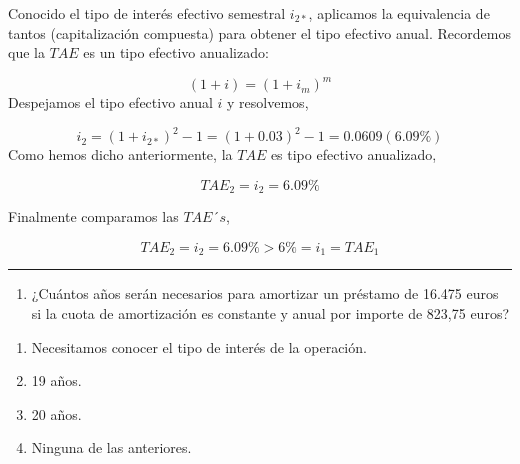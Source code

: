 \documentclass[
  letterpaper,
  DIV=11,
  numbers=noendperiod]{scrreprt}
\providecommand{\tightlist}{%
  \setlength{\itemsep}{0pt}\setlength{\parskip}{0pt}}\usepackage{longtable,booktabs,array}
\begin{document}
\begin{tcolorbox}[enhanced jigsaw, left=2mm, opacityback=0, colback=white, breakable, arc=.35mm, bottomrule=.15mm, rightrule=.15mm, toprule=.15mm, leftrule=.75mm, colframe=quarto-callout-tip-color-frame]
\begin{minipage}[t]{\textwidth - 5.5mm}
Conocido el tipo de interés efectivo semestral \(i_{2*}\), aplicamos la
equivalencia de tantos (capitalización compuesta) para obtener el tipo
efectivo anual. Recordemos que la \(TAE\) es un tipo efectivo
anualizado:

\[(1+i)=(1+ i _m)^m\] Despejamos el tipo efectivo anual \(i\) y
resolvemos,

\[i_2=\left(1+{i_{2*}}\right)^2-1=\left(1+0.03\right)^2-1=0.0609\left(6.09\%\right)\]
Como hemos dicho anteriormente, la \(TAE\) es tipo efectivo anualizado,

\[TAE_2=i_2=6.09\%\]

Finalmente comparamos las \(TAE´s\),

\[TAE_2=i_2=6.09\%>6\%=i_1=TAE_1\]

\end{minipage}%
\end{tcolorbox}

\begin{center}\rule{0.5\linewidth}{0.5pt}\end{center}

\begin{enumerate}
\def\labelenumi{\arabic{enumi}.}
\setcounter{enumi}{12}
\tightlist
\item
  ¿Cuántos años serán necesarios para amortizar un préstamo de 16.475
  euros si la cuota de amortización es constante y anual por importe de
  823,75 euros?
\end{enumerate}

\begin{enumerate}
\def\labelenumi{\alph{enumi})}
\item
  Necesitamos conocer el tipo de interés de la operación.
\item
  19 años.
\item
  20 años.
\item
  Ninguna de las anteriores.
\end{enumerate}
\end{document}
